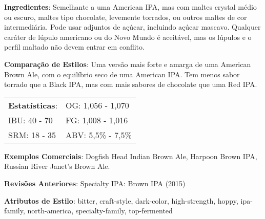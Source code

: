 \textbf{Ingredientes}: Semelhante a uma American IPA, mas com maltes crystal médio ou escuro, maltes tipo chocolate, levemente torrados, ou outros maltes de cor intermediária. Pode usar adjuntos de açúcar, incluindo açúcar mascavo. Qualquer caráter de lúpulo americano ou do Novo Mundo é aceitável, mas os lúpulos e o perfil maltado não devem entrar em conflito.

\textbf{Comparação de Estilos}: Uma versão mais forte e amarga de uma American Brown Ale, com o equilíbrio seco de uma American IPA. Tem menos sabor torrado que a Black IPA, mas com mais sabores de chocolate que uma Red IPA.

\begin{tabular}{@{}p{35mm}p{35mm}@{}}
  \textbf{Estatísticas}: & OG: 1,056 - 1,070 \\
  IBU: 40 - 70  & FG: 1,008 - 1,016 \\
  SRM: 18 - 35  & ABV: 5,5\% - 7,5\%
\end{tabular}

\textbf{Exemplos Comerciais}: Dogfish Head Indian Brown Ale, Harpoon Brown IPA, Russian River Janet’s Brown Ale.

\textbf{Revisões Anteriores}: Specialty IPA: Brown IPA (2015)

\textbf{Atributos de Estilo}: bitter, craft-style, dark-color, high-strength, hoppy, ipa-family, north-america, specialty-family, top-fermented
